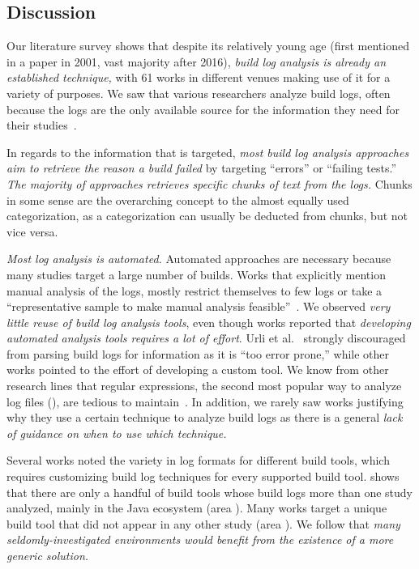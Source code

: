 \subsection{Discussion}
\label{sec:lit-sur:discussion}

Our literature survey shows that despite its relatively young age
(first mentioned in a paper in 2001, vast majority after
2016), \emph{build log analysis is already an established technique,}
with 61 works in different venues making use of it for a variety of
purposes.
We saw that various researchers analyze build logs, often because the
logs are the only available source for the
information they need for their studies~\cite{ren2018automated,
seo2014programmers,beller2017oops,zampetti2017open,rausch2017empirical}.

In regards to the information that is targeted, \emph{most build log
analysis approaches aim to retrieve the reason a build failed} by
targeting ``errors'' or ``failing tests.''
\emph{The majority of approaches retrieves specific chunks of
text from the logs.} Chunks in some sense are the overarching concept to
the almost equally used categorization, as a categorization can usually
be deducted from chunks, but not vice versa.

\emph{Most log analysis is automated.} Automated approaches are
necessary because many studies target a large number of builds.
Works
that explicitly mention manual analysis of the logs, mostly
restrict themselves to few logs or take a ``representative sample to
make manual analysis feasible''~\cite{zolfagharinia2017not}.
We observed \emph{very little reuse of build log analysis tools},
even though works reported that
\emph{developing automated analysis tools requires a lot of effort}.
Urli et al.~\cite{urli2018design} strongly discouraged from parsing
build logs for information as it is ``too error prone,'' while other
works pointed to the effort of developing a custom tool.
We know from other research lines that regular expressions, the second
most popular way to analyze log files (),
are tedious to
maintain~\cite{michael2019regexes}.
In addition, we rarely saw works justifying why they use a certain
technique to analyze build logs as there is a general \emph{lack of
guidance on when to use which technique.}

Several works noted the variety in log formats for different build
tools, which requires customizing build log techniques for
every supported build tool.
 shows that there are only a handful of
build tools whose build logs more than one study analyzed, mainly in
the Java ecosystem (area ).
Many works target a unique build tool that did not appear in any other
study (area ). We follow that \emph{many seldomly-investigated
environments would benefit from the
existence of a more generic solution.}

